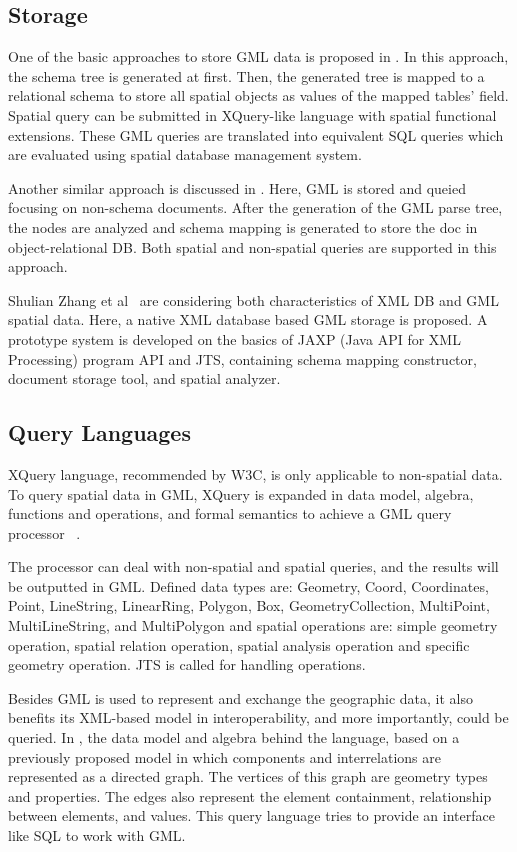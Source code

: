 \documentclass[a4paper,12pt]{article}
\begin{document}
\subsection{Storage}
\label{storage}
One of the basic approaches to store GML data is proposed in \cite{Li2004}.
In this approach, the schema tree is generated at first. Then, the generated
tree is mapped to a relational schema to store all spatial objects as 
values of the mapped tables' field. Spatial query can be submitted 
in XQuery\cite{xquery}-like language with spatial functional extensions.
These GML queries are translated into equivalent SQL queries which are evaluated 
using spatial database management system.

Another similar approach is discussed in \cite{Zhu2011}. Here, GML is stored and queied 
focusing on non-schema documents. After the generation of the GML parse tree,
the nodes are analyzed and  schema mapping is generated to store the doc in object-relational DB. Both spatial and non-spatial queries are supported in this approach.

Shulian Zhang et al~\cite{Zhang2008} are considering both characteristics of XML DB and GML spatial data. Here, a native XML database based GML storage is proposed. A prototype system is developed on the basics of JAXP (Java API for XML Processing) program API 
and JTS, containing schema mapping constructor, document storage tool, 
and spatial analyzer.

\subsection{Query Languages}
\label{query}
XQuery language, recommended by W3C, is only 
applicable to non-spatial data. To query spatial data in GML,
XQuery is expanded in data model, algebra, functions and operations, 
and formal semantics to achieve a GML query processor~\cite{Fubao2010} .

The processor can deal with non-spatial and spatial queries, 
and the results will be outputted in GML.
Defined data types are: Geometry, Coord, Coordinates, Point, LineString, LinearRing, 
Polygon, Box, GeometryCollection, MultiPoint, MultiLineString, and MultiPolygon 
and spatial operations are: simple geometry operation, spatial relation 
operation, spatial analysis operation and specific geometry operation.
JTS\cite{jts} is called for handling operations.

Besides GML is used to represent and exchange 
the geographic data, it also benefits its XML-based model in interoperability, 
and more importantly, could be queried. In \cite{corcoles2001}, the data model 
and algebra behind the language, based on a previously proposed model 
in which components and interrelations are represented as a directed graph. 
The vertices of this graph are geometry types and properties. The edges also
represent the element containment, relationship between elements, and values. 
This query language tries to provide an interface like SQL to work with GML.
\end{document}
